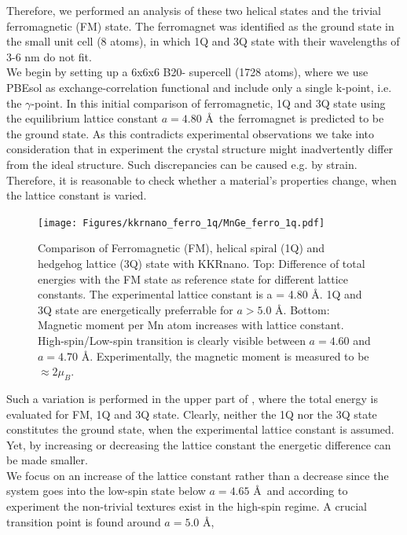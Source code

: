 \documentclass [a4paper, 12pt]{article}
\begin{document}
Therefore, we performed
an analysis of these two helical states and the trivial ferromagnetic (FM) state.
The ferromagnet was identified as the ground state in the small unit cell (8 atoms), 
in which 1Q and 3Q state with their wavelengths of
3-6 nm do not fit.
\\
We begin by setting up a 6x6x6 B20- supercell (1728 atoms), where we use PBEsol 
as exchange-correlation functional
and include only a single k-point, i.e. the $\gamma$-point.
In this initial comparison of ferromagnetic, 1Q and 3Q state using the equilibrium lattice constant
$a=4.80$ \AA \, the ferromagnet is predicted to be the ground state.
As this contradicts experimental observations we take into consideration that
in experiment the crystal structure might inadvertently differ from the ideal structure.
Such discrepancies can be caused e.g. by strain.
\\
Therefore, it is reasonable to check whether a material's properties change, when the
lattice constant is varied.
\begin{figure}[h]
\begin{center}
 \texttt{[image: Figures/kkrnano\_ferro\_1q/MnGe\_ferro\_1q.pdf]}
\end{center}
\caption{
	Comparison of Ferromagnetic (FM), helical spiral (1Q) and hedgehog lattice (3Q) state with KKRnano.
	Top: Difference of total energies with the FM state as reference state for different lattice constants. 
	The experimental lattice constant is a = 4.80 \AA. 1Q and 3Q state are energetically preferrable 
	for $a > 5.0$ \AA. Bottom: Magnetic moment per Mn atom increases with lattice constant. 
	High-spin/Low-spin transition is clearly visible between $a = 4.60$ and $a = 4.70$ \AA.
	Experimentally, the magnetic moment is measured to be $\approx 2 \mu_{B}$.
	}
\label{fig:MnGe_ferro_1q}
\end{figure}
Such a variation is performed in the upper part of , where
the total energy is evaluated for FM, 1Q and 3Q state.
Clearly, neither the 1Q nor the 3Q state constitutes the ground state,
when the experimental lattice constant is assumed.
Yet, by increasing or decreasing the lattice constant the energetic difference can be made
smaller.
\\
We focus on an increase of the lattice constant rather than a decrease since 
the system goes into the low-spin state below $a=4.65$ \AA \, and according to experiment
the non-trivial textures
exist in the high-spin regime.
A crucial transition point is found around $a=5.0$ \AA,
\end{document}
